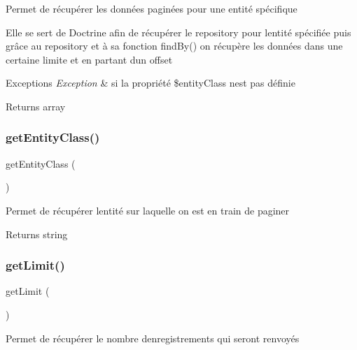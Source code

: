 Permet de récupérer les données paginées pour une entité spécifique

Elle se sert de Doctrine afin de récupérer le repository pour l\textquotesingle{}entité spécifiée puis grâce au repository et à sa fonction find\+By() on récupère les données dans une certaine limite et en partant d\textquotesingle{}un offset


\begin{DoxyExceptions}{Exceptions}
{\em Exception} & si la propriété \$entity\+Class n\textquotesingle{}est pas définie\\
\hline
\end{DoxyExceptions}
\begin{DoxyReturn}{Returns}
array 
\end{DoxyReturn}
\mbox{\label{class_app_1_1_service_1_1_pagination_service_a82bf7d9129d40bb5d953f2b08210fccc}} 
\subsubsection{\texorpdfstring{getEntityClass()}{getEntityClass()}}
{\footnotesize\ttfamily get\+Entity\+Class (\begin{DoxyParamCaption}{ }\end{DoxyParamCaption})}

Permet de récupérer l\textquotesingle{}entité sur laquelle on est en train de paginer

\begin{DoxyReturn}{Returns}
string 
\end{DoxyReturn}
\mbox{\label{class_app_1_1_service_1_1_pagination_service_adc86593a522f6adc4e47b02b97a6f8d0}} 
\subsubsection{\texorpdfstring{getLimit()}{getLimit()}}
{\footnotesize\ttfamily get\+Limit (\begin{DoxyParamCaption}{ }\end{DoxyParamCaption})}

Permet de récupérer le nombre d\textquotesingle{}enregistrements qui seront renvoyés

